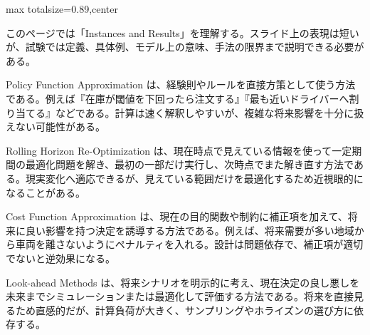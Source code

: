 \begin{minipage}[t]{0.58\textwidth}
\begin{adjustbox}{max totalsize={\textwidth}{0.89\textheight},center}
\begin{minipage}{\textwidth}\scriptsize
{}このページでは「Instances and Results」を理解する。スライド上の表現は短いが、試験では定義、具体例、モデル上の意味、手法の限界まで説明できる必要がある。\par
Policy Function Approximation は、経験則やルールを直接方策として使う方法である。例えば『在庫が閾値を下回ったら注文する』『最も近いドライバーへ割り当てる』などである。計算は速く解釈しやすいが、複雑な将来影響を十分に扱えない可能性がある。\par
Rolling Horizon Re-Optimization は、現在時点で見えている情報を使って一定期間の最適化問題を解き、最初の一部だけ実行し、次時点でまた解き直す方法である。現実変化へ適応できるが、見えている範囲だけを最適化するため近視眼的になることがある。\par
Cost Function Approximation は、現在の目的関数や制約に補正項を加えて、将来に良い影響を持つ決定を誘導する方法である。例えば、将来需要が多い地域から車両を離さないようにペナルティを入れる。設計は問題依存で、補正項が適切でないと逆効果になる。\par
Look-ahead Methods は、将来シナリオを明示的に考え、現在決定の良し悪しを未来までシミュレーションまたは最適化して評価する方法である。将来を直接見るため直感的だが、計算負荷が大きく、サンプリングやホライズンの選び方に依存する。\par

\end{minipage}
\end{adjustbox}
\end{minipage}
